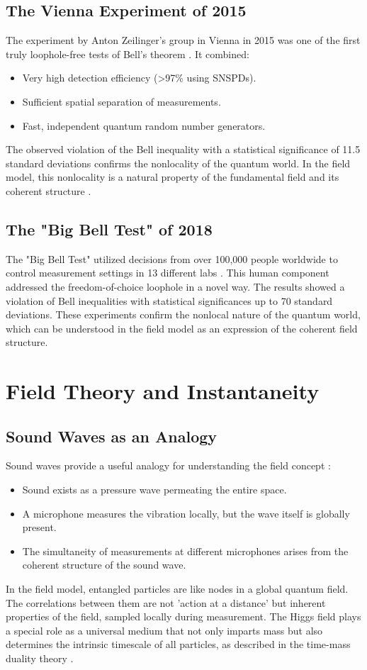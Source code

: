 \documentclass[12pt,a4paper]{article}
\begin{document}
	\subsection{The Vienna Experiment of 2015}
	The experiment by Anton Zeilinger's group in Vienna in 2015 was one of the first truly loophole-free tests of Bell's theorem \cite{Giustina2015}\relax. It combined:
	\begin{itemize}
		\item Very high detection efficiency (>97\% using SNSPDs).
		\item Sufficient spatial separation of measurements.
		\item Fast, independent quantum random number generators.
	\end{itemize}
	The observed violation of the Bell inequality with a statistical significance of 11.5 standard deviations confirms the nonlocality of the quantum world. In the field model, this nonlocality is a natural property of the fundamental field and its coherent structure \cite{Zeilinger2010}\relax.
	
	\subsection{The "Big Bell Test" of 2018}
	The "Big Bell Test" utilized decisions from over 100,000 people worldwide to control measurement settings in 13 different labs \cite{BigBellTest2018}\relax. This human component addressed the freedom-of-choice loophole in a novel way. The results showed a violation of Bell inequalities with statistical significances up to 70 standard deviations.
	These experiments confirm the nonlocal nature of the quantum world, which can be understood in the field model as an expression of the coherent field structure.
	
	\section{Field Theory and Instantaneity}
	\subsection{Sound Waves as an Analogy}
	Sound waves provide a useful analogy for understanding the field concept \cite{Bohm1980}\relax:
	\begin{itemize}
		\item Sound exists as a pressure wave permeating the entire space.
		\item A microphone measures the vibration locally, but the wave itself is globally present.
		\item The simultaneity of measurements at different microphones arises from the coherent structure of the sound wave.
	\end{itemize}
	In the field model, entangled particles are like nodes in a global quantum field. The correlations between them are not 'action at a distance' but inherent properties of the field, sampled locally during measurement. The Higgs field plays a special role as a universal medium that not only imparts mass but also determines the intrinsic timescale of all particles, as described in the time-mass duality theory \cite{Pascher2024}\relax.
	
\end{document}
